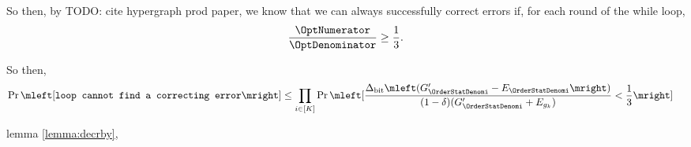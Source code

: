 So then, by TODO: cite hypergraph prod paper, we know that we can always successfully
correct errors if, for each round of the while loop,
$$
	\frac{\OptNumerator}{\OptDenominator}	\geq \frac{1}{3}.
$$

\newcommand{\OptVarRV}{Q}
\newcommand{\OptVarEq}{
\frac
			{\DegBit \mleft(\genscoreRVCorrected_{\OrderStatDenomi} - \lyingGenerator_{\OrderStatDenomi}\mright)}
			{(1 - \delta)(\genscoreRVCorrected_{\OrderStatDenomi} + \lyingGenerator_{g_k})}
}
So then, \begin{align*}
	\Pr\mleft[\texttt{loop cannot find a correcting error}\mright] &\leq
		\prod_{i \in [K]} \Pr\mleft[\OptVarEq < \frac{1}{3} \mright]
\end{align*}



 lemma \ref{lemma:decrby}, 


